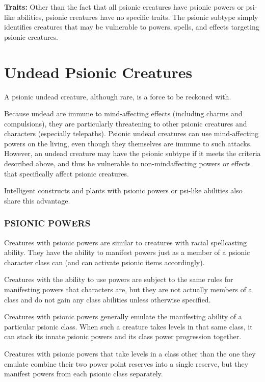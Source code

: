 \documentclass{article}
\begin{document}
\textbf{Traits:} Other than the fact that all psionic creatures have psionic powers 
or psi-like abilities, psionic creatures have no specific traits. The psionic subtype 
simply identifies creatures that may be vulnerable to powers, spells, and effects 
targeting psionic creatures.

\section*{\textbf{Undead Psionic Creatures}}

A psionic undead creature, although rare, is a force to be reckoned with.

Because undead are immune to mind-affecting effects (including charms and compulsions), 
they are particularly threatening to other psionic creatures and characters (especially 
telepaths). Psionic undead creatures can use mind-affecting powers on the living, 
even though they themselves are immune to such attacks. However, an undead creature 
may have the psionic subtype if it meets the criteria described above, and thus 
be vulnerable to non-mindaffecting powers or effects that specifically affect psionic 
creatures.

Intelligent constructs and plants with psionic powers or psi-like abilities also 
share this advantage.

\vspace{12pt}
\subsubsection*{PSIONIC POWERS}

Creatures with psionic powers are similar to creatures with racial spellcasting 
ability. They have the ability to manifest powers just as a member of a psionic 
character class can (and can activate psionic items accordingly).

Creatures with the ability to use powers are subject to the same rules for manifesting 
powers that characters are, but they are not actually members of a class and do 
not gain any class abilities unless otherwise specified.

Creatures with psionic powers generally emulate the manifesting ability of a particular 
psionic class. When such a creature takes levels in that same class, it can stack 
its innate psionic powers and its class power progression together. 

Creatures with psionic powers that take levels in a class other than the one they 
emulate combine their two power point reserves into a single reserve, but they 
manifest powers from each psionic class separately.
\end{document}
